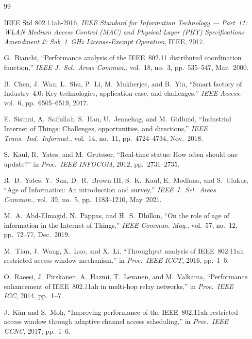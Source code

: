 \documentclass[journal]{IEEEtran}
\begin{document}

\begin{thebibliography}{99}

IEEE Std 802.11ah-2016, \emph{IEEE Standard for Information Technology
--- Part~11: WLAN Medium Access Control (MAC) and Physical Layer (PHY)
Specifications Amendment 2: Sub~1~GHz License-Exempt Operation},
IEEE, 2017.

G.~Bianchi, ``Performance analysis of the IEEE~802.11 distributed
coordination function,'' \emph{IEEE J.\ Sel.\ Areas Commun.},
vol.~18, no.~3, pp.~535--547, Mar.~2000.

B.~Chen, J.~Wan, L.~Shu, P.~Li, M.~Mukherjee, and B.~Yin,
``Smart factory of Industry~4.0: Key technologies, application case,
and challenges,'' \emph{IEEE Access}, vol.~6,
pp.~6505--6519, 2017.

E.~Sisinni, A.~Saifullah, S.~Han, U.~Jennehag, and M.~Gidlund,
``Industrial Internet of Things: Challenges, opportunities, and
directions,'' \emph{IEEE Trans.\ Ind.\ Informat.}, vol.~14, no.~11,
pp.~4724--4734, Nov.~2018.

S.~Kaul, R.~Yates, and M.~Gruteser, ``Real-time status: How often
should one update?'' in \emph{Proc.\ IEEE INFOCOM}, 2012,
pp.~2731--2735.

R.~D.~Yates, Y.~Sun, D.~R.~Brown III, S.~K.~Kaul, E.~Modiano, and
S.~Ulukus, ``Age of Information: An introduction and survey,''
\emph{IEEE J.\ Sel.\ Areas Commun.}, vol.~39, no.~5,
pp.~1183--1210, May~2021.

M.~A.~Abd-Elmagid, N.~Pappas, and H.~S.~Dhillon, ``On the role of
age of information in the Internet of Things,'' \emph{IEEE Commun.
Mag.}, vol.~57, no.~12, pp.~72--77, Dec.~2019.

M.~Tian, J.~Wang, X.~Luo, and X.~Li, ``Throughput analysis of
IEEE~802.11ah restricted access window mechanism,'' in
\emph{Proc.\ IEEE ICCT}, 2016, pp.~1--6.

O.~Raeesi, J.~Pirskanen, A.~Hazmi, T.~Levanen, and M.~Valkama,
``Performance enhancement of IEEE~802.11ah in multi-hop relay
networks,'' in \emph{Proc.\ IEEE ICC}, 2014, pp.~1--7.

J.~Kim and S.~Moh, ``Improving performance of the IEEE~802.11ah
restricted access window through adaptive channel access scheduling,''
in \emph{Proc.\ IEEE CCNC}, 2017, pp.~1--6.


\end{thebibliography}
\end{document}
